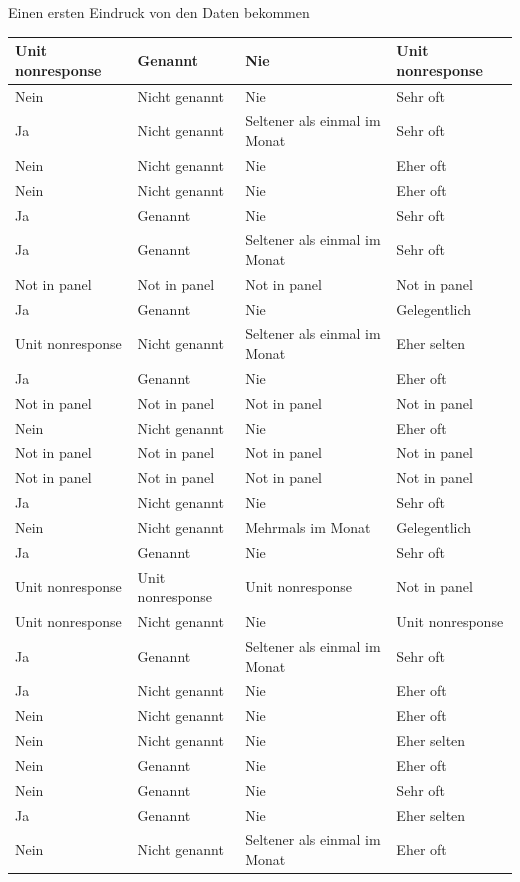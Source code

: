 \documentclass[ignorenonframetext,]{beamer}
\begin{document}
\begin{frame}{Einen ersten Eindruck von den Daten bekommen}
\begin{tabular}{l|l|l|l}
\hline
Unit nonresponse & Genannt & Nie & Unit nonresponse\\
\hline
Nein & Nicht genannt & Nie & Sehr oft\\
\hline
Ja & Nicht genannt & Seltener als einmal im Monat & Sehr oft\\
\hline
Nein & Nicht genannt & Nie & Eher oft\\
\hline
Nein & Nicht genannt & Nie & Eher oft\\
\hline
Ja & Genannt & Nie & Sehr oft\\
\hline
Ja & Genannt & Seltener als einmal im Monat & Sehr oft\\
\hline
Not in panel & Not in panel & Not in panel & Not in panel\\
\hline
Ja & Genannt & Nie & Gelegentlich\\
\hline
Unit nonresponse & Nicht genannt & Seltener als einmal im Monat & Eher selten\\
\hline
Ja & Genannt & Nie & Eher oft\\
\hline
Not in panel & Not in panel & Not in panel & Not in panel\\
\hline
Nein & Nicht genannt & Nie & Eher oft\\
\hline
Not in panel & Not in panel & Not in panel & Not in panel\\
\hline
Not in panel & Not in panel & Not in panel & Not in panel\\
\hline
Ja & Nicht genannt & Nie & Sehr oft\\
\hline
Nein & Nicht genannt & Mehrmals im Monat & Gelegentlich\\
\hline
Ja & Genannt & Nie & Sehr oft\\
\hline
Unit nonresponse & Unit nonresponse & Unit nonresponse & Not in panel\\
\hline
Unit nonresponse & Nicht genannt & Nie & Unit nonresponse\\
\hline
Ja & Genannt & Seltener als einmal im Monat & Sehr oft\\
\hline
Ja & Nicht genannt & Nie & Eher oft\\
\hline
Nein & Nicht genannt & Nie & Eher oft\\
\hline
Nein & Nicht genannt & Nie & Eher selten\\
\hline
Nein & Genannt & Nie & Eher oft\\
\hline
Nein & Genannt & Nie & Sehr oft\\
\hline
Ja & Genannt & Nie & Eher selten\\
\hline
Nein & Nicht genannt & Seltener als einmal im Monat & Eher oft\\

\end{tabular}
\end{frame}
\end{document}
